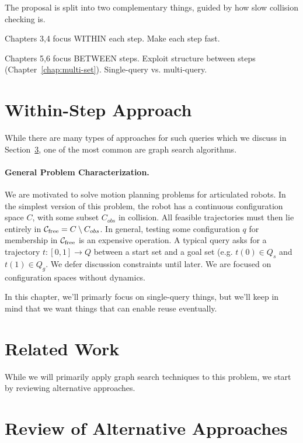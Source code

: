 The proposal is split into two complementary things,
guided by how slow collision checking is.

Chapters 3,4 focus WITHIN each step.
Make each step fast.

Chapters 5,6 focus BETWEEN steps.
Exploit structure between steps (Chapter~\ref{chap:multi-set}).
Single-query vs. multi-query.

\section{Within-Step Approach}

While there are many types of approaches for such queries
which we discuss in Section~\ref{sec:related-work},
one of the most common are graph search algorithms.

\paragraph{General Problem Characterization.}

We are motivated to solve motion planning problems for articulated robots.
In the simplest version of this problem,
the robot has a continuous configuration space $C$,
with some subset $C_{obs}$ in collision.
All feasible trajectories must then lie entirely in
$\mathcal{C}_{\mbox{\scriptsize free}} = C \setminus C_{obs}$.
In general, testing some configuration $q$ for membership in
$\mathcal{C}_{\mbox{\scriptsize free}}$
is an expensive operation.
A typical query asks for a trajectory $t: [0,1] \rightarrow Q$ between
a start set and a goal set (e.g. $t(0) \in Q_s$ and $t(1) \in Q_g$.
We defer discussion constraints until later.
We are focused on configuration spaces without dynamics.

In this chapter,
we'll primarly focus on single-query things,
but we'll keep in mind that we want things that can enable reuse eventually.

\section{Related Work}

While we will primarily apply graph search techniques to this problem,
we start by reviewing alternative approaches.

\section{Review of Alternative Approaches}
\label{sec:related-work}

